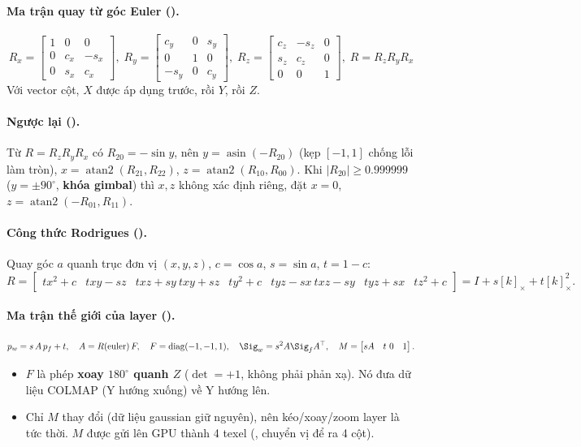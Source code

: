 \paragraph{Ma trận quay từ góc Euler ().}
\[
R_x=\begin{bmatrix}1&0&0\\0&c_x&-s_x\\0&s_x&c_x\end{bmatrix},\;
R_y=\begin{bmatrix}c_y&0&s_y\\0&1&0\\-s_y&0&c_y\end{bmatrix},\;
R_z=\begin{bmatrix}c_z&-s_z&0\\s_z&c_z&0\\0&0&1\end{bmatrix},\;
R=R_zR_yR_x
\]
Với vector cột, $X$ được áp dụng trước, rồi $Y$, rồi $Z$.

\paragraph{Ngược lại ().}
Từ $R=R_zR_yR_x$ có $R_{20}=-\sin y$, nên $y=\operatorname{asin}(-R_{20})$ (kẹp $[-1,1]$ chống lỗi làm tròn), $x=\operatorname{atan2}(R_{21},R_{22})$, $z=\operatorname{atan2}(R_{10},R_{00})$. Khi $|R_{20}|\ge0.999999$ ($y=\pm90^\circ$, \textbf{khóa gimbal}) thì $x,z$ không xác định riêng, đặt $x=0$, $z=\operatorname{atan2}(-R_{01},R_{11})$.

\paragraph{Công thức Rodrigues ().}
Quay góc $a$ quanh trục đơn vị $(x,y,z)$, $c=\cos a$, $s=\sin a$, $t=1-c$:
\[
R=\begin{bmatrix}tx^2+c & txy-sz & txz+sy\ txy+sz & ty^2+c & tyz-sx\ txz-sy & tyz+sx & tz^2+c\end{bmatrix}
= I + s[k]_\times + t[k]_\times^2 .
\]

\paragraph{Ma trận thế giới của layer ().}
\[
p_w = s\,A\,p_f + t,\quad A=R(\mathrm{euler})\,F,\quad F=\mathrm{diag}(-1,-1,1),\quad
\Sig_w = s^2 A\Sig_f A^{\top},\quad
M=\begin{bmatrix}sA & t\ 0 & 1\end{bmatrix}.
\]
\begin{itemize}
\item $F$ là phép \textbf{xoay $180^\circ$ quanh $Z$} ($\det=+1$, không phải phản xạ). Nó đưa dữ liệu COLMAP (Y hướng xuống) về Y hướng lên.
\item Chỉ $M$ thay đổi (dữ liệu gaussian giữ nguyên), nên kéo/xoay/zoom layer là tức thời. $M$ được gửi lên GPU thành 4 texel (, chuyển vị để ra 4 cột).
\end{itemize}

